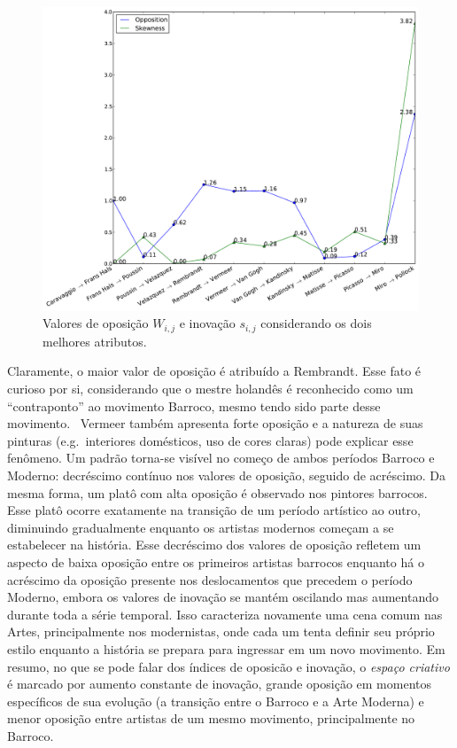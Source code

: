 \begin{figure}[h!]
\begin{center}
        \includegraphics[width=\columnwidth]{figs/caso1_oposEinov}
      \caption{Valores de oposição $W_{i,j}$ e inovação $s_{i,j}$ considerando
        os dois melhores atributos.}
        \label{fig:caso1_oposEinov}
\end{center}
\end{figure}

Claramente, o maior valor de oposição é atribuído a Rembrandt. Esse
fato é curioso por si, considerando que o mestre holandês é
reconhecido como um ``contraponto'' ao movimento Barroco, mesmo tendo
sido parte desse movimento.~\cite{gombrich} Vermeer também apresenta
forte oposição e a natureza de suas pinturas (e.g.\ interiores
domésticos, uso de cores claras) pode explicar esse fenômeno. Um
padrão torna-se visível no começo de ambos períodos Barroco e Moderno:
decréscimo contínuo nos valores de oposição, seguido de acréscimo. Da
mesma forma, um platô com alta oposição é observado nos pintores
barrocos. Esse platô ocorre exatamente na transição de um período
artístico ao outro, diminuindo gradualmente enquanto os artistas
modernos começam a se estabelecer na história. Esse decréscimo dos
valores de oposição refletem um aspecto de baixa oposição entre os
primeiros artistas barrocos enquanto há o acréscimo da oposição
presente nos deslocamentos que precedem o período Moderno, embora os
valores de inovação se mantém oscilando mas aumentando durante toda a
série temporal. Isso caracteriza novamente uma cena comum nas Artes,
principalmente nos modernistas, onde cada um tenta definir seu próprio
estilo enquanto a história se prepara para ingressar em um novo
movimento. Em resumo, no que se pode falar dos índices de oposicão e
inovação, o \textit{espaço criativo} é marcado por aumento constante
de inovação, grande oposição em momentos específicos de sua evolução
(a transição entre o Barroco e a Arte Moderna) e menor oposição entre
artistas de um mesmo movimento, principalmente no Barroco.

